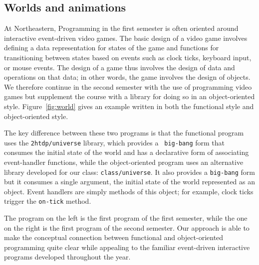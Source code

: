 \documentclass[submission,copyright]{eptcs}
\begin{document}



\subsection{Worlds and animations}

At Northeastern, Programming in the first semester is often oriented
around interactive event-driven video games.  The basic design of a
video game involves defining a data representation for states of the
game and functions for transitioning between states based on events
such as clock ticks, keyboard input, or mouse events.  The design of a
game thus involves the design of data and operations on that data; in
other words, the game involves the design of objects.  We therefore
continue in the second semester with the use of programming video
games but supplement the course with a library for doing so in an
object-oriented style.  Figure~\ref{fig:world} gives an example
written in both the functional style and object-oriented style.

The key difference between these two programs is that the functional
program uses the {\tt 2htdp/universe} library, which provides a {\tt
  big-bang} form that consumes the initial state of the world and has
a declarative form of associating event-handler functions, while the
object-oriented program uses an alternative library developed for our
class: {\tt class/universe}.  It also provides a {\tt big-bang} form
but it consumes a single argument, the initial state of the world
represented as an object.  Event handlers are simply methods of this
object; for example, clock ticks trigger the {\tt on-tick} method.

The program on the left is the first program of the first semester,
while the one on the right is the first program of the second
semester.  Our approach is able to make the conceptual connection
between functional and object-oriented programming quite clear while
appealing to the familiar event-driven interactive programs developed
throughout the year.
\end{document}
